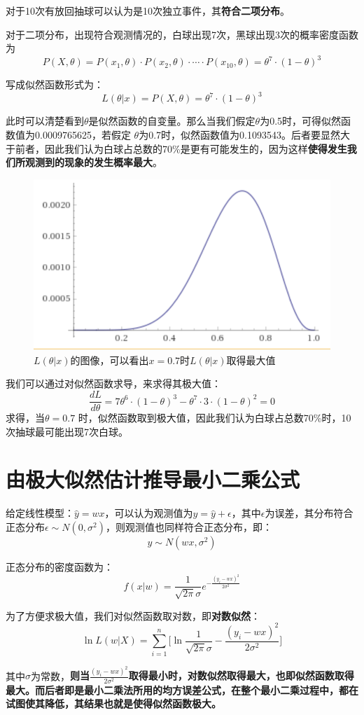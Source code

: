 \documentclass[12pt]{article}
\begin{document}
对于10次有放回抽球可以认为是10次独立事件，其\textbf{符合二项分布}。

对于二项分布，出现符合观测情况的，白球出现7次，黑球出现3次的概率密度函数为
$$
P(X,\theta) = P(x_1,\theta)\cdot P(x_2,\theta)\cdot \cdots \cdot P(x_{10},\theta) = \theta^7\cdot(1-\theta)^3
$$

写成似然函数形式为：
$$
L(\theta|x) = P(X,\theta) = \theta^7\cdot(1-\theta)^3
$$

此时可以清楚看到$\theta$是似然函数的自变量。那么当我们假定$\theta$为0.5时，可得似然函数值为0.0009765625，若假定 $\theta$为0.7时，似然函数值为0.1093543。后者要显然大于前者，因此我们认为白球占总数的70\%是更有可能发生的，因为这样\textbf{使得发生我们所观测到的现象的发生概率最大}。
\begin{figure}[H]
    \centering
    \includegraphics[width=.5\textwidth]{fig/likelihood_distribution_dice_example.png}
    \caption*{$L(\theta|x)$的图像，可以看出$x=0.7$时$L(\theta|x)$取得最大值}
\end{figure} 

我们可以通过对似然函数求导，来求得其极大值：
$$
\frac{dL}{d\theta} = 7\theta^6\cdot(1-\theta)^3 - \theta^7\cdot3\cdot(1-\theta)^2 = 0
$$
求得，当$\theta=0.7$ 时，似然函数取到极大值，因此我们认为白球占总数70\%时，10次抽球最可能出现7次白球。

\section{由极大似然估计推导最小二乘公式}
给定线性模型：$\hat{y} = wx$，可以认为观测值为$y = \hat{y} + \epsilon$，其中$\epsilon$为误差，其分布符合正态分布$\epsilon \sim N(0, \sigma^2)$，则观测值也同样符合正态分布，即：
$$
y \sim N(wx, \sigma^2)
$$

正态分布的密度函数为：
$$
f(x|w) = \frac{1}{\sqrt{2\pi}\sigma}e^{-\frac{(y_i - wx)^2}{2\sigma^2}}
$$

为了方便求极大值，我们对似然函数取对数，即\textbf{对数似然}：
$$
\ln{L(w|X)} = \sum_{i=1}^n\big[\ln{\frac{1}{\sqrt{2\pi}\sigma}} - \frac{(y_i - wx)^2}{2\sigma^2}\big]
$$

其中$\sigma$为常数，\textbf{则当$\frac{(y_i - wx)^2}{2\sigma^2}$取得最小时，对数似然取得最大，也即似然函数取得最大。而后者即是最小二乘法所用的均方误差公式，在整个最小二乘过程中，都在试图使其降低，其结果也就是使得似然函数极大。}
\end{document}
